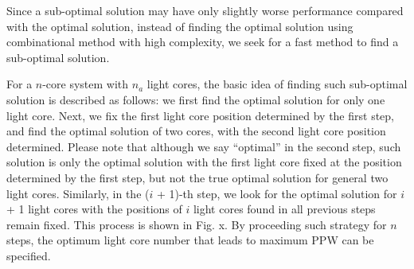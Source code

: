 Since a sub-optimal solution may have only slightly worse performance compared with the optimal solution, instead of finding the optimal solution using combinational method with high complexity, we seek for a fast method to find a sub-optimal solution.

For a $n$-core system with $n_{a}$ light cores, the basic idea of finding such sub-optimal solution is described as follows: we first find the optimal solution for only one light core. Next, we fix the first light core position determined by the first step, and find the optimal solution of two cores, with the second light core position determined. Please note that although we say “optimal” in the second step, such solution is only the optimal solution with the first light core fixed at the position determined by the first step, but not the true optimal solution for general two light cores. Similarly, in the ($i$ + 1)-th step, we look for the optimal solution for $i$ + 1 light cores with the positions of $i$ light cores found in all previous steps remain fixed. This process is shown in Fig. x. By proceeding such strategy for $n$ steps, the optimum light core number that leads to maximum PPW can be specified.
